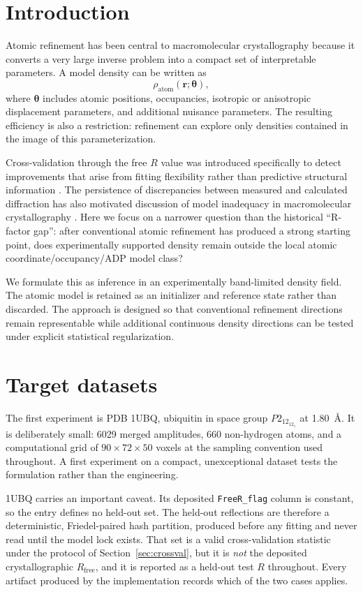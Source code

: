 \documentclass[11pt]{article}
\newcommand{\Rfree}{\ensuremath{R_{\mathrm{free}}}}
\begin{document}
\section{Introduction}
\label{sec:intro}
Atomic refinement has been central to macromolecular crystallography because it converts a very large inverse problem into a compact set of interpretable parameters. A model density can be written as
\begin{equation}
  \rho_{\mathrm{atom}}(\mathbf r;\boldsymbol\theta),
\end{equation}
where $\boldsymbol\theta$ includes atomic positions, occupancies, isotropic or anisotropic displacement parameters, and additional nuisance parameters. The resulting efficiency is also a restriction: refinement can explore only densities contained in the image of this parameterization.

Cross-validation through the free $R$ value was introduced specifically to detect improvements that arise from fitting flexibility rather than predictive structural information \cite{brunger1992}. The persistence of discrepancies between measured and calculated diffraction has also motivated discussion of model inadequacy in macromolecular crystallography \cite{holton2014}. Here we focus on a narrower question than the historical ``R-factor gap'': after conventional atomic refinement has produced a strong starting point, does experimentally supported density remain outside the local atomic coordinate/occupancy/ADP model class?

We formulate this as inference in an experimentally band-limited density field. The atomic model is retained as an initializer and reference state rather than discarded. The approach is designed so that conventional refinement directions remain representable while additional continuous density directions can be tested under explicit statistical regularization.

\section{Target datasets}
\label{sec:targets}
The first experiment is PDB 1UBQ, ubiquitin in space group $P2_12_12_1$ at 1.80~\AA. It is
deliberately small: 6029 merged amplitudes, 660 non-hydrogen atoms, and a computational grid
of $90\times72\times50$ voxels at the sampling convention used throughout. A first experiment
on a compact, unexceptional dataset tests the formulation rather than the engineering.

1UBQ carries an important caveat. Its deposited \texttt{FreeR\_flag} column is constant, so
the entry defines no held-out set. The held-out reflections are therefore a deterministic,
Friedel-paired hash partition, produced before any fitting and never read until the model
lock exists. That set is a valid cross-validation statistic under the protocol of
Section~\ref{sec:crossval}, but it is \emph{not} the deposited crystallographic \Rfree, and it
is reported as a held-out test $R$ throughout. Every artifact produced by the implementation
records which of the two cases applies.
\end{document}
